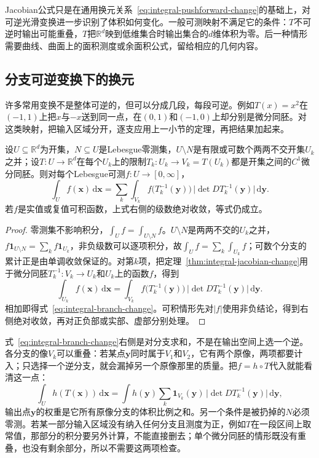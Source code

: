 Jacobian公式只是在通用换元关系~\eqref{eq:integral-pushforward-change}的基础上，对可逆光滑变换进一步识别了体积如何变化。一般可测映射不满足它的条件：$T$不可逆时输出可能重叠，$T$把$\mathbb R^d$映到低维集合时输出集合的$d$维体积为零。后一种情形需要曲线、曲面上的面积测度或余面积公式，留给相应的几何内容。

\subsection{分支可逆变换下的换元}
\label{sec:integral-branch-change}

许多常用变换不是整体可逆的，但可以分成几段，每段可逆。例如$T(x)=x^2$在$(-1,1)$上把$x$与$-x$送到同一点，在$(0,1)$和$(-1,0)$上却分别是微分同胚。对这类映射，把输入区域分开，逐支应用上一小节的定理，再把结果加起来。

\begin{theorem}[分支可逆变换下的换元]
\label{thm:integral-branch-change}
设$U\subseteq\mathbb R^d$为开集，$N\subseteq U$是Lebesgue零测集，$U\setminus N$是有限或可数个两两不交开集$U_k$之并；设$T:U\to\mathbb R^d$在每个$U_k$上的限制$T_k:U_k\to V_k=T(U_k)$都是开集之间的$C^1$微分同胚。则对每个Lebesgue可测$f:U\to[0,\infty]$，
\begin{equation}
 \int_Uf(\bm x)\,\mathrm d\bm x=\sum_k\int_{V_k}f\bigl(T_k^{-1}(\bm y)\bigr)\,\bigl|\det DT_k^{-1}(\bm y)\bigr|\,\mathrm d\bm y.
 \label{eq:integral-branch-change}
\end{equation}
若$f$是实值或复值可积函数，上式右侧的级数绝对收敛，等式仍成立。
\end{theorem}

\begin{proof}
零测集不影响积分，$\int_Uf=\int_{U\setminus N}f$。$U\setminus N$是两两不交的$U_k$之并，$f\mathbf 1_{U\setminus N}=\sum_kf\mathbf 1_{U_k}$，非负级数可以逐项积分，故$\int_Uf=\sum_k\int_{U_k}f$；可数个分支的累计正是由单调收敛保证的。对第$k$项，把定理~\ref{thm:integral-jacobian-change}用于微分同胚$T_k^{-1}:V_k\to U_k$和$U_k$上的函数$f$，得到
\[
 \int_{U_k}f(\bm x)\,\mathrm d\bm x=\int_{V_k}f\bigl(T_k^{-1}(\bm y)\bigr)\,\bigl|\det DT_k^{-1}(\bm y)\bigr|\,\mathrm d\bm y.
\]
相加即得式~\eqref{eq:integral-branch-change}。可积情形先对$|f|$使用非负结论，得到右侧绝对收敛，再对正负部或实部、虚部分别处理。
\end{proof}

式~\eqref{eq:integral-branch-change}右侧是对分支求和，不是在输出空间上选一个逆。各分支的像$V_k$可以重叠：若某点$\bm y$同时属于$V_1$和$V_2$，它有两个原像，两项都要计入；只选择一个逆分支，就会漏掉另一个原像那里的质量。把$f=h\circ T$代入就能看清这一点：
\[
 \int_Uh(T(\bm x))\,\mathrm d\bm x=\int h(\bm y)\sum_k\mathbf 1_{V_k}(\bm y)\,\bigl|\det DT_k^{-1}(\bm y)\bigr|\,\mathrm d\bm y,
\]
输出点$\bm y$的权重是它所有原像分支的体积比例之和。另一个条件是被扔掉的$N$必须零测。若某一部分输入区域没有纳入任何分支且测度为正，例如$T$在一段区间上取常值，那部分的积分要另外计算，不能直接删去；单个微分同胚的情形既没有重叠，也没有剩余部分，所以不需要这两项检查。


